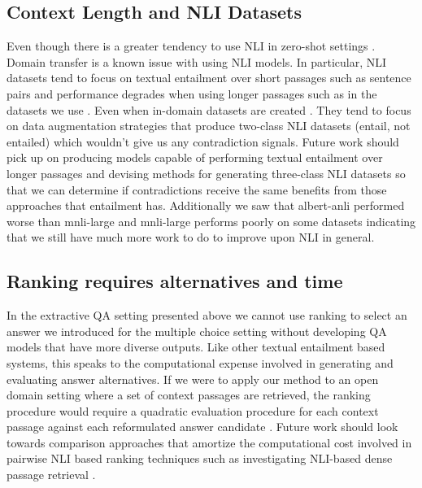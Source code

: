 \documentclass[11pt]{article}
\begin{document}
\subsection{Context Length and NLI Datasets}
Even though there is a greater tendency to use NLI in zero-shot settings \citep{yin_universal_2020}. Domain transfer is a known issue with using NLI models. In particular, NLI datasets tend to focus on textual entailment over short passages such as sentence pairs and performance degrades when using longer passages such as in the datasets we use \citep{mishra_looking_2021}. Even when in-domain datasets are created \citep{chen_can_2021, khot_scitail_2018, mishra_looking_2021}. They tend to focus on data augmentation strategies that produce two-class NLI datasets (entail, not entailed) which wouldn’t give us any contradiction signals. Future work should pick up on producing models capable of performing textual entailment over longer passages and devising methods for generating three-class NLI datasets so that we can determine if contradictions receive the same benefits from those approaches that entailment has. Additionally we saw that albert-anli performed worse than mnli-large and mnli-large performs poorly on some datasets indicating that we still have much more work to do to improve upon NLI in general.
\subsection{Ranking requires alternatives and time}
In the extractive QA setting presented above we cannot use ranking to select an answer we introduced for the multiple choice setting without developing QA models that have more diverse outputs. Like other textual entailment based systems, this speaks to the computational expense involved in generating and evaluating answer alternatives. If we were to apply our method to an open domain setting where a set of context passages are retrieved, the ranking procedure would require a quadratic evaluation procedure for each context passage against each reformulated answer candidate \citep{schuster_stretching_2022}. Future work should look towards comparison approaches that amortize the computational cost involved in pairwise NLI based ranking techniques such as investigating NLI-based dense passage retrieval \citep{reimers_sentence-bert_2019}.
\end{document}
